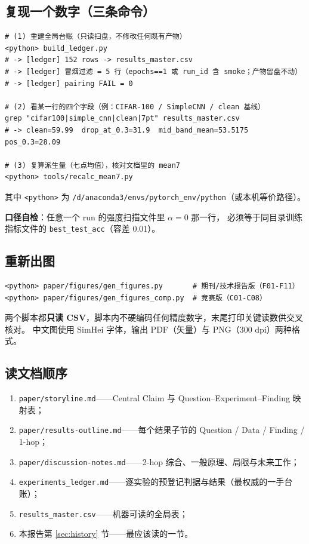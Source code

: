 \documentclass[11pt,a4paper]{ctexart}
\begin{document}
\subsection{复现一个数字（三条命令）}

\begin{lstlisting}
# (1) 重建全局台账（只读扫盘，不修改任何既有产物）
<python> build_ledger.py
# -> [ledger] 152 rows -> results_master.csv
# -> [ledger] 冒烟过滤 = 5 行（epochs==1 或 run_id 含 smoke；产物留盘不动）
# -> [ledger] pairing FAIL = 0

# (2) 看某一行的四个字段（例：CIFAR-100 / SimpleCNN / clean 基线）
grep "cifar100|simple_cnn|clean|7pt" results_master.csv
# -> clean=59.99  drop_at_0.3=31.9  mid_band_mean=53.5175  pos_0.3=28.09

# (3) 复算派生量（七点均值），核对文档里的 mean7
<python> tools/recalc_mean7.py
\end{lstlisting}

其中 \texttt{<python>} 为 \texttt{/d/anaconda3/envs/pytorch\_env/python}（或本机等价路径）。

\textbf{口径自检}：任意一个 run 的强度扫描文件里 $\alpha=0$ 那一行，
必须等于同目录训练指标文件的 \texttt{best\_test\_acc}（容差 0.01）。

\subsection{重新出图}

\begin{lstlisting}
<python> paper/figures/gen_figures.py       # 期刊/技术报告版（F01-F11）
<python> paper/figures/gen_figures_comp.py  # 竞赛版（C01-C08）
\end{lstlisting}

两个脚本都\textbf{只读 CSV}，脚本内不硬编码任何精度数字，末尾打印关键读数供交叉核对。
中文图使用 SimHei 字体，输出 PDF（矢量）与 PNG（300 dpi）两种格式。

\subsection{读文档顺序}

\begin{enumerate}[leftmargin=2em,itemsep=2pt]
  \item \texttt{paper/storyline.md}——Central Claim 与 Question--Experiment--Finding 映射表；
  \item \texttt{paper/results-outline.md}——每个结果子节的 Question / Data / Finding / 1-hop；
  \item \texttt{paper/discussion-notes.md}——2-hop 综合、一般原理、局限与未来工作；
  \item \texttt{experiments\_ledger.md}——逐实验的预登记判据与结果（最权威的一手台账）；
  \item \texttt{results\_master.csv}——机器可读的全局表；
  \item 本报告第 \ref{sec:history} 节——最应该读的一节。
\end{enumerate}
\end{document}
